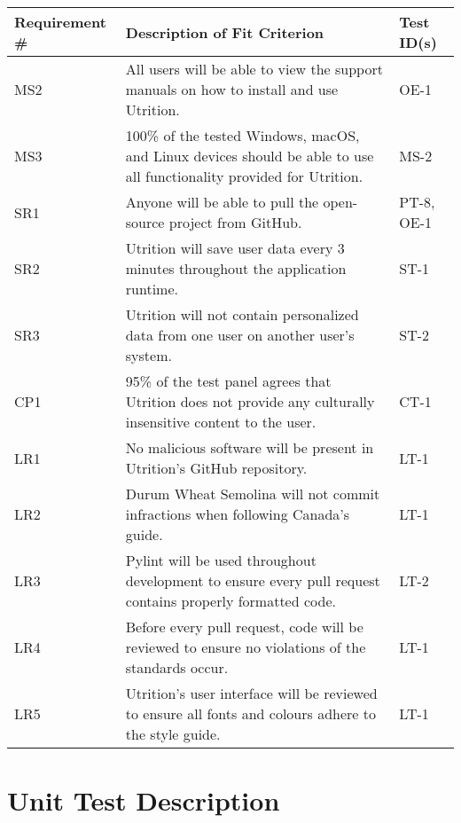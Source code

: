 \documentclass[12pt, titlepage]{article}
\begin{document}
	\begin{table}[H]
		\begin{tabularx}{\textwidth}{|l|X|l|}
			\hline
			{\bf Requirement \#} & {\bf Description of Fit Criterion} & {\bf Test ID(s)}\\
			\hline
			MS2 & All users will be able to view the support manuals on how to install and use Utrition. & OE-1\\
			\hline
			MS3 & 100\% of the tested Windows, macOS, and Linux devices should be able to use all functionality provided for Utrition. & MS-2\\
			\hline
			SR1 & Anyone will be able to pull the open-source project from GitHub. & PT-8, OE-1 \\
			\hline
			SR2 & Utrition will save user data every 3 minutes throughout the 
			application runtime. & ST-1\\
			\hline
			SR3 & Utrition will not contain personalized data from one user on another user's system. & ST-2\\
			\hline
			CP1 & 95\% of the test panel agrees that Utrition does not provide any culturally insensitive content to the user. & CT-1\\
			\hline
			LR1 & No malicious software will be present in Utrition’s GitHub repository. & LT-1\\
			\hline
			LR2 & Durum Wheat Semolina will not commit infractions when following Canada’s guide. & LT-1\\
			\hline
			LR3 & Pylint will be used throughout development to ensure every pull request contains properly formatted code. & LT-2\\
			\hline
			LR4 & Before every pull request, code will be reviewed to ensure no violations of the standards occur.  & LT-1\\
			\hline
			LR5 & Utrition's user interface will be reviewed to ensure all fonts and colours adhere to the style guide.  & LT-1\\
			\hline
		\end{tabularx}
	\end{table}
	
	\section{Unit Test Description}
	
	
\end{document}
